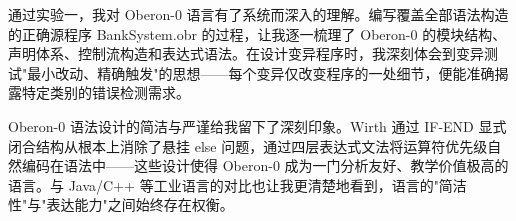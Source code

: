 通过实验一，我对 Oberon-0 语言有了系统而深入的理解。编写覆盖全部语法构造的正确源程序 BankSystem.obr 的过程，让我逐一梳理了 Oberon-0 的模块结构、声明体系、控制流构造和表达式语法。在设计变异程序时，我深刻体会到变异测试"最小改动、精确触发"的思想——每个变异仅改变程序的一处细节，便能准确揭露特定类别的错误检测需求。

Oberon-0 语法设计的简洁与严谨给我留下了深刻印象。Wirth 通过 IF-END 显式闭合结构从根本上消除了悬挂 else 问题，通过四层表达式文法将运算符优先级自然编码在语法中——这些设计使得 Oberon-0 成为一门分析友好、教学价值极高的语言。与 Java/C++ 等工业语言的对比也让我更清楚地看到，语言的"简洁性"与"表达能力"之间始终存在权衡。

